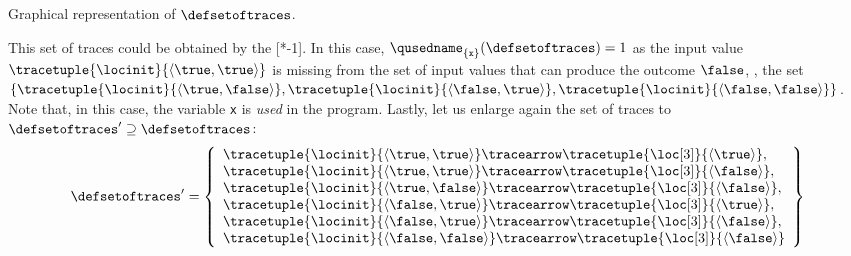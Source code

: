 \begin{example}
\begin{marginfigure}[*-8]
\caption{Graphical representation of $\defsetoftraces$.}
\end{marginfigure}
This set of traces could be obtained by the [*-1].
In this case, $\qusedname_{\{\texttt{x} \}}(\defsetoftraces)=1$ as the input value $\tracetuple{\locinit}{\langle \true, \true\rangle}$ is missing from the set of input values that can produce the outcome $\false$, \cf, the set $\{ \tracetuple{\locinit}{\langle \true, \false\rangle}, \tracetuple{\locinit}{\langle \false, \true\rangle}, \tracetuple{\locinit}{\langle \false, \false\rangle} \}$.
Note that, in this case, the variable \texttt{x} is \emph{used} in the program.
Lastly, let us enlarge again the set of traces to $\defsetoftraces' \supseteq \defsetoftraces$:
\begin{align*}
  \defsetoftraces'
  =
  \left\{
    \begin{array}{l}
      \tracetuple{\locinit}{\langle \true, \true\rangle}\tracearrow\tracetuple{\loc[3]}{\langle \true\rangle}, \\
      \tracetuple{\locinit}{\langle \true, \true\rangle}\tracearrow\tracetuple{\loc[3]}{\langle \false\rangle}, \\
      \tracetuple{\locinit}{\langle \true, \false\rangle}\tracearrow\tracetuple{\loc[3]}{\langle \false\rangle}, \\
      \tracetuple{\locinit}{\langle \false, \true\rangle}\tracearrow\tracetuple{\loc[3]}{\langle \true\rangle}, \\
      \tracetuple{\locinit}{\langle \false, \true\rangle}\tracearrow\tracetuple{\loc[3]}{\langle \false\rangle}, \\
      \tracetuple{\locinit}{\langle \false, \false\rangle}\tracearrow\tracetuple{\loc[3]}{\langle \false\rangle}
    \end{array}
    \right\}
\end{align*}
\begin{marginfigure}[*-6]
\end{marginfigure}
\end{example}
